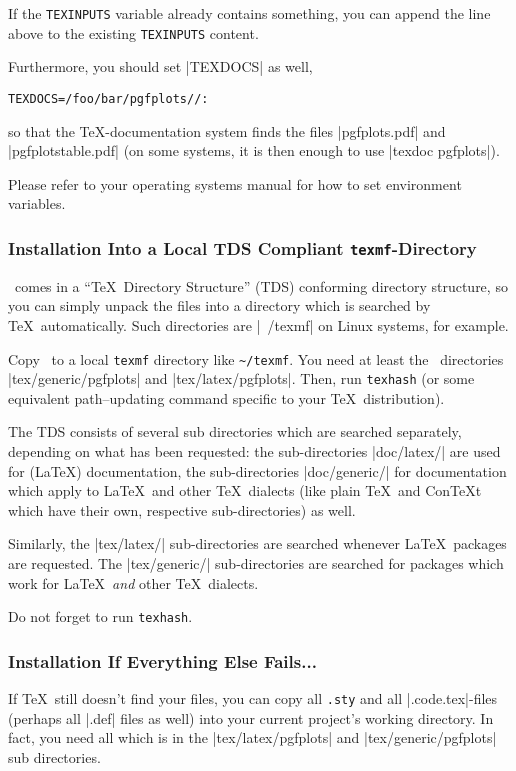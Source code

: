 If the \texttt{TEXINPUTS} variable already contains something, you can append the line above to the existing \texttt{TEXINPUTS} content.

Furthermore, you should set |TEXDOCS| as well,
\begin{verbatim}
TEXDOCS=/foo/bar/pgfplots//:
\end{verbatim}
so that the \TeX-documentation system finds the files |pgfplots.pdf| and |pgfplotstable.pdf| (on some systems, it is then enough to use |texdoc pgfplots|).

Please refer to your operating systems manual for how to set environment variables.

\subsubsection{Installation Into a Local TDS Compliant \texttt{texmf}-Directory}
\label{pgfplots:tds}
\PGFPlots\ comes in a ``\TeX\ Directory Structure'' (TDS) conforming directory structure, so you can simply unpack the files into a directory which is searched by \TeX\ automatically. Such directories are |~/texmf| on Linux systems, for example.

Copy \PGFPlots\ to a local \texttt{texmf} directory like \lstinline!~/texmf!. You need at least the \PGFPlots\ directories |tex/generic/pgfplots| and |tex/latex/pgfplots|. Then, run \lstinline!texhash! (or some equivalent path--updating command specific to your \TeX\ distribution). 

The TDS consists of several sub directories which are searched separately, depending on what has been requested: the sub-directories |doc/latex/| are used for (\LaTeX) documentation, the sub-directories |doc/generic/| for documentation which apply to \LaTeX\ and other \TeX\ dialects (like plain \TeX\ and Con\TeX t which have their own, respective sub-directories) as well.

Similarly, the |tex/latex/| sub-directories are searched whenever \LaTeX\ packages are requested. The |tex/generic/| sub-directories are searched for packages which work for \LaTeX\ \emph{and} other \TeX\ dialects.

Do not forget to run \lstinline!texhash!.

\subsubsection{Installation If Everything Else Fails...}
If \TeX\ still doesn't find your files, you can copy all \lstinline!.sty! and all |.code.tex|-files (perhaps all |.def| files as well) into your current project's working directory. In fact, you need all which is in the |tex/latex/pgfplots| and |tex/generic/pgfplots| sub directories.


